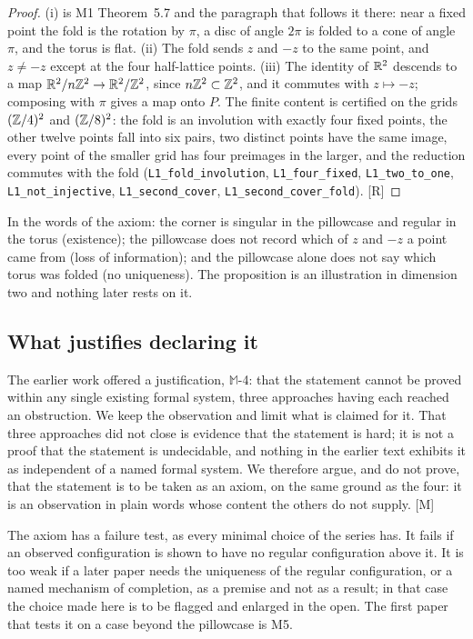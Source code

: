\documentclass[11pt,a4paper]{article}
\theoremstyle{plain}
\theoremstyle{definition}
\theoremstyle{remark}
\newcommand{\rigR}{[\textup{R}]}
\newcommand{\rigM}{[\textup{M}]}
\newcommand{\Max}[1]{$\mathbb{M}$-#1}
\begin{document}
\begin{proof}
(i) is M1 Theorem~5.7 and the paragraph that follows it there: near a fixed point the fold is the rotation by $\pi$, a disc of angle $2\pi$ is folded to a cone of angle $\pi$, and the torus is flat. (ii) The fold sends $z$ and $-z$ to the same point, and $z\neq-z$ except at the four half-lattice points. (iii) The identity of $\mathbb{R}^{2}$ descends to a map $\mathbb{R}^{2}/n\mathbb{Z}^{2}\to\mathbb{R}^{2}/\mathbb{Z}^{2}$, since $n\mathbb{Z}^{2}\subset\mathbb{Z}^{2}$, and it commutes with $z\mapsto-z$; composing with $\pi$ gives a map onto $P$. The finite content is certified on the grids $(\mathbb{Z}/4)^{2}$ and $(\mathbb{Z}/8)^{2}$: the fold is an involution with exactly four fixed points, the other twelve points fall into six pairs, two distinct points have the same image, every point of the smaller grid has four preimages in the larger, and the reduction commutes with the fold (\texttt{L1\_fold\_involution}, \texttt{L1\_four\_fixed}, \texttt{L1\_two\_to\_one}, \texttt{L1\_not\_injective}, \texttt{L1\_second\_cover}, \texttt{L1\_second\_cover\_fold}). \rigR
\end{proof}

In the words of the axiom: the corner is singular in the pillowcase and regular in the torus (existence); the pillowcase does not record which of $z$ and $-z$ a point came from (loss of information); and the pillowcase alone does not say which torus was folded (no uniqueness). The proposition is an illustration in dimension two and nothing later rests on it.

\subsection{What justifies declaring it}\label{sec:justify}

The earlier work offered a justification, \Max{4}: that the statement cannot be proved within any single existing formal system, three approaches having each reached an obstruction. We keep the observation and limit what is claimed for it. That three approaches did not close is evidence that the statement is hard; it is not a proof that the statement is undecidable, and nothing in the earlier text exhibits it as independent of a named formal system. We therefore argue, and do not prove, that the statement is to be taken as an axiom, on the same ground as the four: it is an observation in plain words whose content the others do not supply. \rigM

The axiom has a failure test, as every minimal choice of the series has. It fails if an observed configuration is shown to have no regular configuration above it. It is too weak if a later paper needs the uniqueness of the regular configuration, or a named mechanism of completion, as a premise and not as a result; in that case the choice made here is to be flagged and enlarged in the open. The first paper that tests it on a case beyond the pillowcase is M5.
\end{document}
